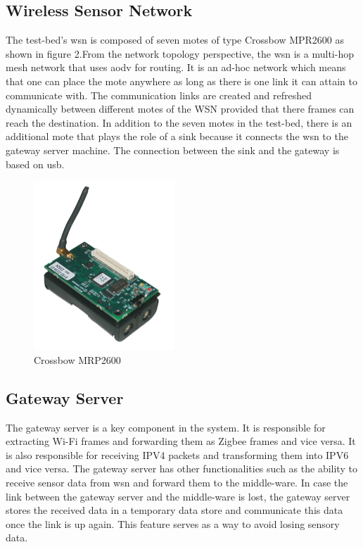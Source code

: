 \documentclass[conference]{IEEEtran}
\begin{document}
\subsection{Wireless Sensor Network}
The test-bed's \gls{wsn} is composed of seven motes of type Crossbow MPR2600 as shown in figure 2.From the network topology perspective, the \gls{wsn} is a multi-hop mesh network that uses \gls{aodv} for routing. It is an ad-hoc network which means that one can place the mote anywhere as long as there is one link it can attain to communicate with. The communication links are created and refreshed dynamically between different motes of the WSN provided that there frames can reach the destination. In addition to the seven motes in the test-bed, there is an additional mote that plays the role of a sink because it connects the \gls{wsn} to the gateway server machine. The connection between the sink and the gateway is based on \gls{usb}.

\begin{figure}[htbp]
\centering
\includegraphics[scale=0.5]{images/micaz.png}
\caption{Crossbow MRP2600}
\label{fig:micaz}
\end{figure}

\subsection{Gateway Server}
The gateway server is a key component in the system. It is responsible for extracting Wi-Fi frames and forwarding them as Zigbee frames and vice versa. It is also responsible for receiving IPV4 packets and transforming them into IPV6 and vice versa. The gateway server has other functionalities such as the ability to receive sensor data from \gls{wsn} and forward them to the middle-ware. In case the link between the gateway server and the middle-ware is lost, the gateway server stores the received data in a temporary data store and communicate this data once the link is up again. This feature serves as a way to avoid losing sensory data.
\end{document}
